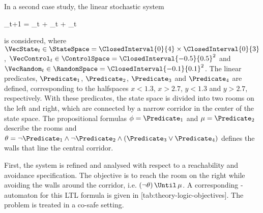 In a second case study, the linear stochastic system

\startformula
    \VecX_{t+1} =  \VecState_{t} +  \VecControl_{t} + \VecRandom_{t}
\stopformula

is considered, where $\VecState_{t} \in \StateSpace = \ClosedInterval{0}{4} \times \ClosedInterval{0}{3}$, $\VecControl_{t} \in \ControlSpace = \ClosedInterval{-0.5}{0.5}^2$ and $\VecRandom_{t} \in \RandomSpace = \ClosedInterval{-0.1}{0.1}^2$.
The linear predicates, $\Predicate_1$, $\Predicate_2$, $\Predicate_3$ and $\Predicate_4$ are defined, corresponding to the halfspaces $x < 1.3$, $x > 2.7$, $y < 1.3$ and $y > 2.7$, respectively.
With these predicates, the state space is divided into two rooms on the left and right, which are connected by a narrow corridor in the center of the state space.
The propositional formulas $\phi = \Predicate_1$ and $\mu = \Predicate_2$ describe the rooms and $\theta = \neg \Predicate_1 \wedge \neg \Predicate_2 \wedge (\Predicate_3 \vee \Predicate_4)$ defines the walls that line the central corridor.

\startsubsection[title={Reachability Analysis},reference=sec:cases-corridor-reachability]


    First, the system is refined and analysed with respect to a reachability and avoidance specification.
    The objective is to reach the room on the right while avoiding the walls around the corridor, i.e.  $( \neg \theta ) \,\Until\, \mu$.
    A corresponding \omega-automaton for this LTL formula is given in [tab:theory-logic-objectives].
    The problem is treated in a co-safe setting.


